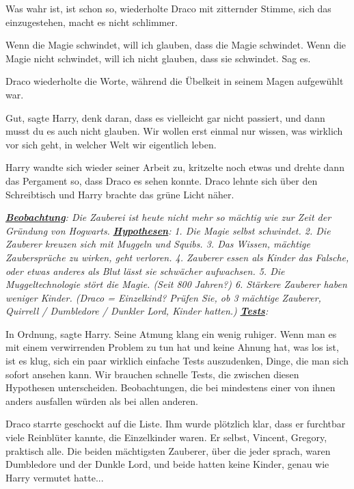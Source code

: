 \glqq Was wahr ist, ist schon so\grqq{}, wiederholte Draco mit zitternder
Stimme, \glqq sich das einzugestehen, macht es nicht schlimmer.\grqq{}

\glqq Wenn die Magie schwindet, will ich glauben, dass die Magie schwindet. Wenn
die Magie nicht schwindet, will ich nicht glauben, dass sie schwindet. Sag
es.\grqq{}

Draco wiederholte die Worte, während die Übelkeit in seinem Magen aufgewühlt
war.

\glqq Gut\grqq{}, sagte Harry, \glqq denk daran, dass es vielleicht gar nicht
passiert, und dann musst du es auch nicht glauben. Wir wollen erst einmal nur
wissen, was wirklich vor sich geht, in welcher Welt wir eigentlich leben.\grqq{}

Harry wandte sich wieder seiner Arbeit zu, kritzelte noch etwas und drehte dann
das Pergament so, dass Draco es sehen konnte. Draco lehnte sich über den
Schreibtisch und Harry brachte das grüne Licht näher.

\emph{\textbf{\underline{Beobachtung}}: Die Zauberei ist heute nicht mehr so
mächtig wie zur Zeit der Gründung von Hogwarts. }
\emph{\textbf{\underline{Hypothesen}}: } \emph{1. Die Magie selbst schwindet. 2.
Die Zauberer kreuzen sich mit Muggeln und Squibs. 3. Das Wissen, mächtige
Zaubersprüche zu wirken, geht verloren. 4. Zauberer essen als Kinder das
Falsche, oder etwas anderes als Blut lässt sie schwächer aufwachsen. 5. Die
Muggeltechnologie stört die Magie. (Seit 800 Jahren?) 6. Stärkere Zauberer haben
weniger Kinder. (Draco = Einzelkind? Prüfen Sie, ob 3 mächtige Zauberer,
Quirrell / Dumbledore / Dunkler Lord, Kinder hatten.)
}\textbf{\emph{\underline{Tests}}}\emph{: }

\glqq In Ordnung\grqq{}, sagte Harry. Seine Atmung klang ein wenig ruhiger.
\glqq Wenn man es mit einem verwirrenden Problem zu tun hat und keine Ahnung
hat, was los ist, ist es klug, sich ein paar wirklich einfache Tests
auszudenken, Dinge, die man sich sofort ansehen kann. Wir brauchen schnelle
Tests, die zwischen diesen Hypothesen unterscheiden. Beobachtungen, die bei
mindestens einer von ihnen anders ausfallen würden als bei allen anderen.\grqq{}

Draco starrte geschockt auf die Liste. Ihm wurde plötzlich klar, dass er
furchtbar viele Reinblüter kannte, die Einzelkinder waren. Er selbst, Vincent,
Gregory, praktisch alle. Die beiden mächtigsten Zauberer, über die jeder sprach,
waren Dumbledore und der Dunkle Lord, und beide hatten keine Kinder, genau wie
Harry vermutet hatte...

